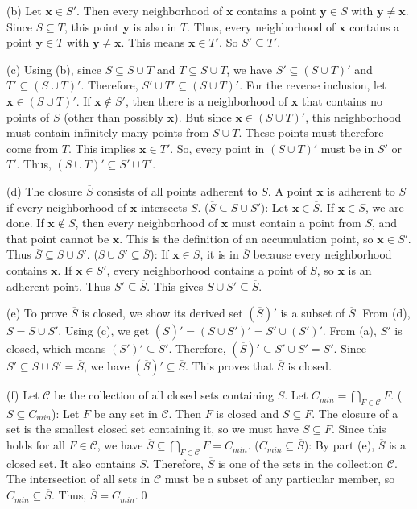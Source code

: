 (b) Let $\mathbf{x} \in S'$. Then every neighborhood of $\mathbf{x}$ contains a point $\mathbf{y} \in S$ with $\mathbf{y} \neq \mathbf{x}$. Since $S \subseteq T$, this point $\mathbf{y}$ is also in $T$. Thus, every neighborhood of $\mathbf{x}$ contains a point $\mathbf{y} \in T$ with $\mathbf{y} \neq \mathbf{x}$. This means $\mathbf{x} \in T'$. So $S' \subseteq T'$.

(c) Using (b), since $S \subseteq S \cup T$ and $T \subseteq S \cup T$, we have $S' \subseteq (S \cup T)'$ and $T' \subseteq (S \cup T)'$. Therefore, $S' \cup T' \subseteq (S \cup T)'$. For the reverse inclusion, let $\mathbf{x} \in (S \cup T)'$. If $\mathbf{x} \notin S'$, then there is a neighborhood of $\mathbf{x}$ that contains no points of $S$ (other than possibly $\mathbf{x}$). But since $\mathbf{x} \in (S \cup T)'$, this neighborhood must contain infinitely many points from $S \cup T$. These points must therefore come from $T$. This implies $\mathbf{x} \in T'$. So, every point in $(S \cup T)'$ must be in $S'$ or $T'$. Thus, $(S \cup T)' \subseteq S' \cup T'$.

(d) The closure $\overline{S}$ consists of all points adherent to $S$. A point $\mathbf{x}$ is adherent to $S$ if every neighborhood of $\mathbf{x}$ intersects $S$.
($\overline{S} \subseteq S \cup S'$): Let $\mathbf{x} \in \overline{S}$. If $\mathbf{x} \in S$, we are done. If $\mathbf{x} \notin S$, then every neighborhood of $\mathbf{x}$ must contain a point from $S$, and that point cannot be $\mathbf{x}$. This is the definition of an accumulation point, so $\mathbf{x} \in S'$. Thus $\overline{S} \subseteq S \cup S'$.
($S \cup S' \subseteq \overline{S}$): If $\mathbf{x} \in S$, it is in $\overline{S}$ because every neighborhood contains $\mathbf{x}$. If $\mathbf{x} \in S'$, every neighborhood contains a point of $S$, so $\mathbf{x}$ is an adherent point. Thus $S' \subseteq \overline{S}$. This gives $S \cup S' \subseteq \overline{S}$.

(e) To prove $\overline{S}$ is closed, we show its derived set $(\overline{S})'$ is a subset of $\overline{S}$. From (d), $\overline{S} = S \cup S'$. Using (c), we get $(\overline{S})' = (S \cup S')' = S' \cup (S')'$. From (a), $S'$ is closed, which means $(S')' \subseteq S'$. Therefore, $(\overline{S})' \subseteq S' \cup S' = S'$. Since $S' \subseteq S \cup S' = \overline{S}$, we have $(\overline{S})' \subseteq \overline{S}$. This proves that $\overline{S}$ is closed.

(f) Let $\mathcal{C}$ be the collection of all closed sets containing $S$. Let $C_{min} = \bigcap_{F \in \mathcal{C}} F$.
($\overline{S} \subseteq C_{min}$): Let $F$ be any set in $\mathcal{C}$. Then $F$ is closed and $S \subseteq F$. The closure of a set is the smallest closed set containing it, so we must have $\overline{S} \subseteq F$. Since this holds for all $F \in \mathcal{C}$, we have $\overline{S} \subseteq \bigcap_{F \in \mathcal{C}} F = C_{min}$.
($C_{min} \subseteq \overline{S}$): By part (e), $\overline{S}$ is a closed set. It also contains $S$. Therefore, $\overline{S}$ is one of the sets in the collection $\mathcal{C}$. The intersection of all sets in $\mathcal{C}$ must be a subset of any particular member, so $C_{min} \subseteq \overline{S}$.
Thus, $\overline{S} = C_{min}$.\qed


